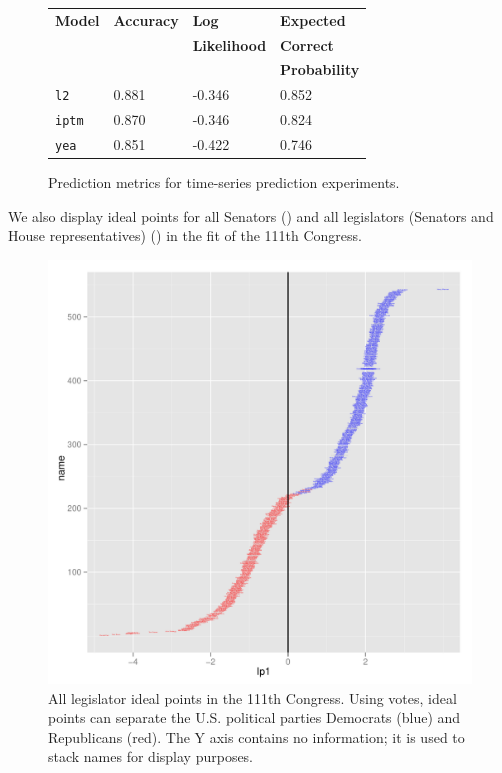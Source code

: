 \begin{figure}
  \center
  \begin{tabular}{|l|l|l|l|}
    \hline
    \textbf{Model} & \textbf{Accuracy} & \textbf{Log} & \textbf{Expected} \\
    & & \textbf{Likelihood} & \textbf{Correct} \\
    & & & \textbf{Probability} \\
    \hline
    \verb!l2! & 0.881 & -0.346 & 0.852 \\
    \hline
    \verb!iptm! & 0.870 & -0.346 & 0.824 \\
    \hline
    \verb!yea! & 0.851 & -0.422 & 0.746 \\
    \hline
  \end{tabular}
  \caption{Prediction metrics for time-series prediction experiments.}
  \label{fig:prediction_stats}
\end{figure}

We also display ideal points for all Senators () and all legislators (Senators and House representatives) () in the fit of the 111th Congress.

\begin{figure}[t]
  \center
  \includegraphics[width=1.\textwidth]
  {chapter_spatial_voting_with_text/figures/134_legislator_name_accuracy_by_ip.pdf}
  \caption{All legislator ideal points in the 111th Congress.  Using
    votes, ideal points can separate the U.S. political parties
    Democrats (blue) and Republicans (red).  The Y axis contains no
    information; it is used to stack names for display purposes.}
\label{fig:all_ideal_points}
\end{figure}

